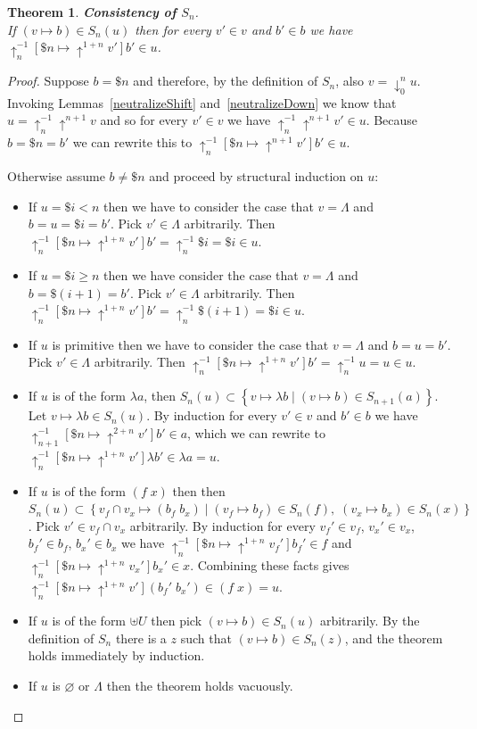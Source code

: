 \documentclass{article}
\newcommand{\shift}[1]{\uparrow^{#1}}
\newcommand{\downshift}[1]{\downarrow^{#1}}
\newtheorem{theorem}{Theorem}
\begin{document}
\begin{theorem}
  \textbf{Consistency of $S_n$}. \\If $(v\mapsto b)\in S_n(u)$ then
  for every $v'\in v$ and $b'\in b$ we have $\shift{-1}_n[\$n\mapsto \shift{1 + n}v']b'\in u$.
\end{theorem}
\begin{proof}
  Suppose $b = \$n$ and therefore, by the definition of $S_n$, also $v = \downshift{n}_0 u$.
  Invoking Lemmas~\ref{neutralizeShift} and~\ref{neutralizeDown}
  we know that $u = \shift{-1}_n\shift{n + 1}v$
  and so for every $v'\in v$ we have $\shift{-1}_n\shift{n + 1}v'\in u$.
  Because $b = \$n = b'$ we can rewrite this to $\shift{-1}_n[\$n\mapsto \shift{n + 1}v']b'\in u$.
  

  
  Otherwise assume $b\not= \$n$ and proceed by structural induction on $u$:

  \begin{itemize}
  \item If $u = \$i < n$ then we have to consider the case that $v = \Lambda$ and $b = u = \$i = b'$.
    Pick $v'\in \Lambda$ arbitrarily. Then $\shift{-1}_n[\$n\mapsto \shift{1 + n}v']b' = \shift{-1}_n\$i = \$i\in u$.
  \item If $u = \$i\geq n$ then we have consider the case that $v = \Lambda$ and $b = \$(i + 1) = b'$.
    Pick $v'\in \Lambda$ arbitrarily. Then $\shift{-1}_n[\$n\mapsto \shift{1 + n}v']b' = \shift{-1}_n\$(i + 1) = \$i\in u$.
  \item If $u$ is primitive then we have to consider the case that $v = \Lambda$ and $b = u = b'$.
    Pick $v'\in \Lambda$ arbitrarily. Then $\shift{-1}_n[\$n\mapsto \shift{1 + n}v']b' = \shift{-1}_nu = u\in u$.
  \item If $u$ is of the form $\lambda a$,
    then $S_n(u)\subset\left\{v\mapsto \lambda b\;|\; (v\mapsto b)\in S_{n + 1}(a) \right\}$.
    Let $v\mapsto \lambda b\in S_n(u)$.
    By induction for every $v'\in v$ and $b'\in b$ we have $\shift{-1}_{n + 1}[\$n\mapsto \shift{2 + n}v']b'\in a$,
    which we can rewrite to $\shift{-1}_{n}[\$n\mapsto \shift{1 + n}v']\lambda b'\in \lambda a = u$.
  \item If $u$ is of the form $(f\;x)$ then
    then $S_n(u)\subset\left\{v_f\cap v_x\mapsto (b_f\;b_x)\;|\; (v_f\mapsto b_f)\in S_{n}(f),\;(v_x\mapsto b_x)\in S_{n}(x) \right\}$.
    Pick $v'\in v_f\cap v_x$ arbitrarily.
    By induction for every $v_f'\in v_f$, $v_x'\in v_x$, $b_f'\in b_f$, $b_x'\in b_x$
    we have $\shift{-1}_{n}[\$n\mapsto \shift{1 + n}v_f'] b_f' \in f$ and $\shift{-1}_{n}[\$n\mapsto \shift{1 + n}v_x'] b_x' \in x$.
    Combining these facts gives
    $\shift{-1}_{n}[\$n\mapsto \shift{1 + n}v'] (b_f'\;b_x') \in (f\;x) = u$.
  \item If $u$ is of the form $\uplus U$ then
    pick $(v\mapsto b)\in S_n(u)$ arbitrarily.
    By the definition of $S_n$ there is a $z$ such that $(v\mapsto b)\in S_n(z)$,
    and the theorem holds immediately by induction.
  \item If $u$  is $\varnothing $ or $\Lambda$ then the theorem holds vacuously.
    \end{itemize}
\end{proof}
\end{document}
